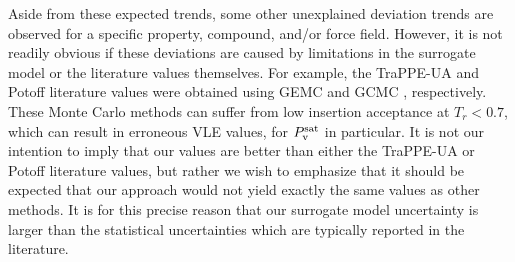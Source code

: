 \documentclass[journal=jctc,manuscript=article]{achemso}
\begin{document}
Aside from these expected trends, some other unexplained deviation trends are observed for a specific property, compound, and/or force field. However, it is not readily obvious if these deviations are caused by limitations in the surrogate model or the literature values themselves. For example, the TraPPE-UA and Potoff literature values were obtained using GEMC \cite{TraPPE,Validation} and GCMC \cite{Mie}, respectively. These Monte Carlo methods can suffer from low insertion acceptance at $T_r<0.7$, which can result in erroneous VLE values, for $P_{\rm v}^{\rm sat}$ in particular. It is not our intention to imply that our values are better than either the TraPPE-UA or Potoff literature values, but rather we wish to emphasize that it should be expected that our approach would not yield exactly the same values as other methods. It is for this precise reason that our surrogate model uncertainty is larger than the statistical uncertainties which are typically reported in the literature.  

\newpage



\end{document}
